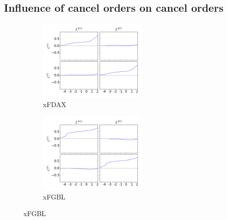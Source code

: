 \documentclass[a4paper,11pt]{article}
\begin{document}
\subsection{Influence of cancel orders on cancel orders}
\label{CC}
\begin{figure}[H]
        \begin{subfigure}[b]{0.45\textwidth}
                \includegraphics[width=\textwidth,height=40mm]{xFDAXPA_PB_TA_TB_LA_LB_CA_CB__CACB-_CACBcausality.png}
                \caption{xFDAX}
        \end{subfigure}
        \begin{subfigure}[b]{0.45\textwidth}
                \includegraphics[width=\textwidth,height=40mm]{xFGBLPA_PB_TA_TB_LA_LB_CA_CB__CACB-_CACBcausality.png}
                \caption{xFGBL}
        \end{subfigure}
\end{figure}
\end{document}
